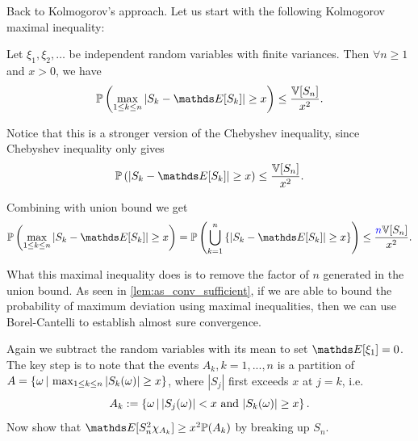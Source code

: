 Back to Kolmogorov's approach. Let us start with the following Kolmogorov maximal inequality:

\begin{proposition}
Let $\xi_1, \xi_2, \dots$ be independent random variables with finite variances. Then $\forall n \ge 1$ and $x > 0$, we have 
\begin{equation*}
    \p\bracket{\max_{1 \le k \le n} | S_k - \E[S_k]| \ge x} \le \frac{\V[S_n]}{x^2}.
\end{equation*}
\end{proposition}

Notice that this is a stronger version of the Chebyshev inequality, since Chebyshev inequality only gives
\begin{equation*}
    \p\bracket{|S_k - \E[S_k]| \geq x} \leq \frac{\V[S_n]}{x^2}.
\end{equation*}

Combining with union bound we get
\begin{equation*}
    \p\bracket{\max_{1\leq k \leq n} |S_k - \E[S_k]| \geq x} = \p\bracket{\bigcup_{k=1}^n \set{|S_k - \E[S_k]| \geq x}} \leq \frac{\textcolor{blue}{n}\V[S_n]}{x^2}.
\end{equation*}

What this maximal inequality does is to remove the factor of $n$ generated in the union bound. As seen in \ref{lem:as_conv_sufficient}, if we are able to bound the probability of maximum deviation using maximal inequalities, then we can use Borel-Cantelli to establish almost sure convergence.

\begin{hint}
Again we subtract the random variables with its mean to set $\E[\xi_1] = 0$. The key step is to note that the events $A_k, k=1,...,n$ is a partition of $A = \left\{ \omega\,|\, \max_{1\leq k \leq n} |S_k(\omega)| \geq x \right \}$, where $|S_j|$ first exceeds $x$ at $j=k$, i.e.
\begin{equation*}
    A_k := \left\{ \omega \,|\, |S_j(\omega)| < x \text{ and } |S_k(\omega)| \geq x \right \}.
\end{equation*}
Now show that $\E[S_n^2 \chi_{A_k}] \geq x^2 \p(A_k)$ by breaking up $S_n$.
\end{hint}

